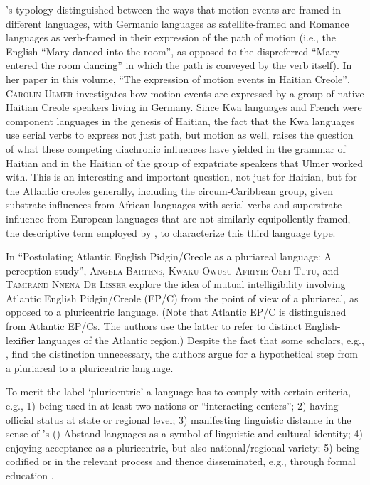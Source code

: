 \documentclass[output=paper,colorlinks,citecolor=brown]{langscibook}
\begin{document}
\citeauthor{Talmy_1991}'s typology \citeyearpar{Talmy_1991} distinguished between the ways that motion events are framed in different languages, with Germanic languages as satellite-framed and Romance languages as verb-framed in their expression of the path of motion (i.e., the English ``Mary danced into the room'', as opposed to the dispreferred ``Mary entered the room dancing'' in which the path is conveyed by the verb itself). In her paper in this volume, “The expression of motion events in Haitian Creole”, \textsc{Carolin Ulmer} investigates how motion events are expressed by a group of native Haitian Creole speakers living in Germany. Since Kwa languages and French were component languages in the genesis of Haitian, the fact that the Kwa languages use serial verbs to express not just path, but motion as well, raises the question of what these competing diachronic influences have yielded in the grammar of Haitian and in the Haitian of the group of expatriate speakers that Ulmer worked with. This is an interesting and important question, not just for Haitian, but for the Atlantic creoles generally, including the circum-Caribbean group, given substrate influences from African languages with serial verbs and superstrate influence from European languages that are not similarly equipollently framed, the descriptive term employed by \citet{Slobin_2004}, to characterize this third language type.

In ``Postulating Atlantic English Pidgin/Creole as a pluriareal language: A perception study'', \textsc{Angela Bartens}, \textsc{Kwaku Owusu Afriyie Osei-Tutu}, and \textsc{Tamirand Nnena De Lisser} explore the idea of mutual intelligibility involving Atlantic English Pidgin/Creole (EP/C) from the point of view of a pluriareal, as opposed to a pluricentric language. (Note that Atlantic EP/C is distinguished from Atlantic EP/Cs. The authors use the latter to refer to distinct English-lexifier languages of the Atlantic region.) Despite the fact that some scholars, e.g., \citet{Dollinger_2019}, find the distinction unnecessary, the authors argue for a hypothetical step from a pluriareal to a pluricentric language.

To merit the label `pluricentric' a language has to comply with certain criteria, e.g., 1) being used in at least two nations or “interacting centers”; 2) having official status at state or regional level; 3) manifesting linguistic distance in the sense of \citeauthor{Kloss-1967}'s (\citeyear{Kloss-1967}) Abstand languages as a symbol of linguistic and cultural identity; 4) enjoying acceptance as a pluricentric, but also national/regional variety; 5) being codified or in the relevant process and thence disseminated, e.g., through formal education \citep[cf.][]{Muhr_2012,Clyne_1992}. 
\end{document}
